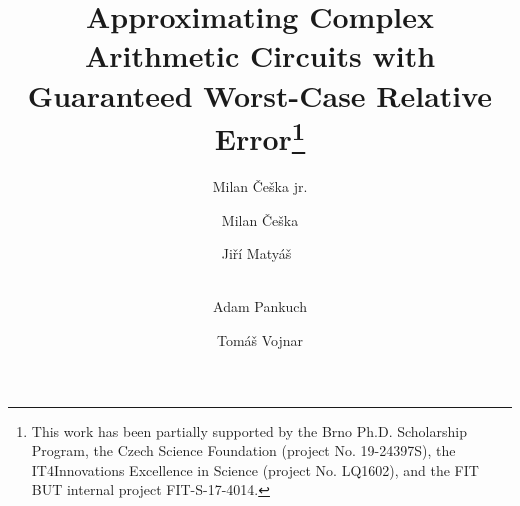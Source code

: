 \documentclass[runningheads]{llncs}
\begin{document}
%
\title{Approximating Complex Arithmetic Circuits with Guaranteed Worst-Case
Relative Error\thanks{This work has been partially supported by the Brno Ph.D.
Scholarship Program, the Czech Science Foundation (project No. 19-24397S), the
IT4Innovations Excellence in Science (project No. LQ1602), and the FIT BUT
internal project FIT-S-17-4014.}}
% 
%
\author{Milan \v{C}e\v{s}ka jr. \and Milan \v{C}e\v{s}ka \and Ji\v{r}\'{i}
Maty\'{a}\v{s}~\Letter \and \\ Adam Pankuch \and Tom\'{a}\v{s} Vojnar}
%
%

\end{document}
